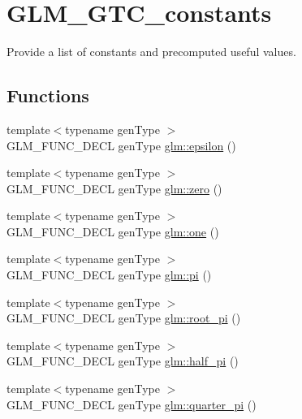 \hypertarget{group__gtc__constants}{\section{G\-L\-M\-\_\-\-G\-T\-C\-\_\-constants}
\label{group__gtc__constants}
}


Provide a list of constants and precomputed useful values.  


\subsection*{Functions}
\begin{DoxyCompactItemize}
\item 
{\footnotesize template$<$typename gen\-Type $>$ }\\G\-L\-M\-\_\-\-F\-U\-N\-C\-\_\-\-D\-E\-C\-L gen\-Type \hyperlink{group__gtc__constants_gacb41049b8d22c8aa90e362b96c524feb}{glm\-::epsilon} ()
\item 
{\footnotesize template$<$typename gen\-Type $>$ }\\G\-L\-M\-\_\-\-F\-U\-N\-C\-\_\-\-D\-E\-C\-L gen\-Type \hyperlink{group__gtc__constants_ga5cc97dd01d37fc199264ff6030578435}{glm\-::zero} ()
\item 
{\footnotesize template$<$typename gen\-Type $>$ }\\G\-L\-M\-\_\-\-F\-U\-N\-C\-\_\-\-D\-E\-C\-L gen\-Type \hyperlink{group__gtc__constants_ga8186ec2c330457d41d9686c47cd3b2d1}{glm\-::one} ()
\item 
{\footnotesize template$<$typename gen\-Type $>$ }\\G\-L\-M\-\_\-\-F\-U\-N\-C\-\_\-\-D\-E\-C\-L gen\-Type \hyperlink{group__gtc__constants_gae671930537266a9a650ccb4b88757692}{glm\-::pi} ()
\item 
{\footnotesize template$<$typename gen\-Type $>$ }\\G\-L\-M\-\_\-\-F\-U\-N\-C\-\_\-\-D\-E\-C\-L gen\-Type \hyperlink{group__gtc__constants_ga1cfeb345f34f72697d14f4db8d5d4c6c}{glm\-::root\-\_\-pi} ()
\item 
{\footnotesize template$<$typename gen\-Type $>$ }\\G\-L\-M\-\_\-\-F\-U\-N\-C\-\_\-\-D\-E\-C\-L gen\-Type \hyperlink{group__gtc__constants_ga7f7a1050729f3b03b1873a06ba4a472f}{glm\-::half\-\_\-pi} ()
\item 
{\footnotesize template$<$typename gen\-Type $>$ }\\G\-L\-M\-\_\-\-F\-U\-N\-C\-\_\-\-D\-E\-C\-L gen\-Type \hyperlink{group__gtc__constants_ga0148d757b4bfda4d86251b8d1ea1dad3}{glm\-::quarter\-\_\-pi} ()

\end{DoxyCompactItemize}
